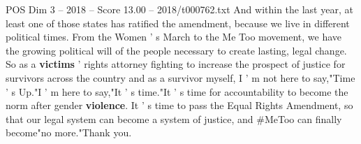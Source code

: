 \begin{textsample}{POS Dim 3 – 2018 – Score 13.00 – 2018/t000762.txt}
And within the last year, at least one of those states has ratified the amendment, because we live in different political times.
From the Women ' s March to the Me Too movement, we have the growing political will of the people necessary to create lasting, legal change.
So as a \textbf{victims} ' rights attorney fighting to increase the prospect of justice for survivors across the country and as a survivor myself, I ' m not here to say,"Time ' s Up."I ' m here to say,"It ' s time."It ' s time for accountability to become the norm after gender \textbf{violence}.
It ' s time to pass the Equal Rights Amendment, so that our legal system can become a system of justice, and \#MeToo can finally become"no more."Thank you.

\end{textsample}
